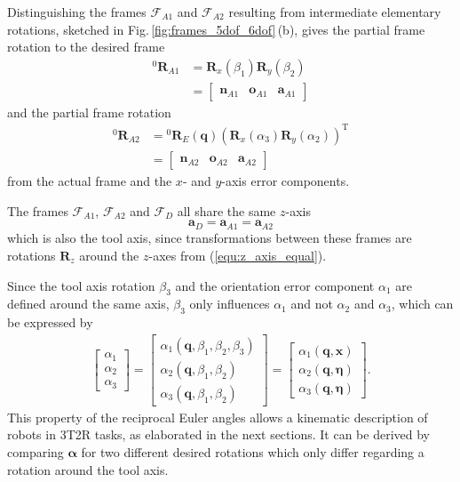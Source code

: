\documentclass{svproc}
\newcommand{\bm}[1]{\boldsymbol{#1}}
\newcommand{\vek}[3]{\boldsymbol{#1}^{#2}_{#3}}
\newcommand{\rotmat}[2]{{{ }^{#1}\boldsymbol{R}}_{#2}}
\newcommand{\transp}[0]{{\mathrm{T}}}
\newcommand{\ks}[1]{{\mathcal{F}}_{#1}}
\begin{document}
Distinguishing the frames $\ks{A1}$ and $\ks{A2}$ resulting from intermediate elementary rotations, sketched in Fig.\,\ref{fig:frames_5dof_6dof}\,(b), gives the partial frame rotation to the desired frame
%
\begin{align}
\rotmat{0}{A1} 
&= 
\bm{R}_x(\beta_1) \bm{R}_y(\beta_2)\\
&=
\begin{bmatrix}
\vek{n}{}{A1} & \vek{o}{}{A1} & \vek{a}{}{A1}
\end{bmatrix} \nonumber
\end{align}
%
and the partial frame rotation
%
\begin{align}
\rotmat{0}{A2} 
&= 
\rotmat{0}{E}(\bm{q})
\left(\bm{R}_x(\alpha_3) \bm{R}_y(\alpha_2)\right)^\transp \\ 
&=
\begin{bmatrix}
\vek{n}{}{A2} & \vek{o}{}{A2} & \vek{a}{}{A2}
\end{bmatrix}\nonumber
\end{align}
%
from the actual frame and the $x$- and $y$-axis error components.

The frames $\ks{A1}$, $\ks{A2}$ and $\ks{D}$ all share the same $z$-axis
%
\begin{equation}
\vek{a}{}{D}
=
\vek{a}{}{A1}
=
\vek{a}{}{A2}
\label{equ:z_axis_equal}
\end{equation}
%
which is also the tool axis, since transformations between these frames are rotations $\bm{R}_z$ around the $z$-axes from (\ref{equ:z_axis_equal}).

Since the tool axis rotation $\beta_3$ and the orientation error component $\alpha_1$ are defined around the same axis, $\beta_3$ only influences $\alpha_1$ and not $\alpha_2$ and $\alpha_3$, which can be expressed by
%
\begin{align}
\begin{bmatrix}
\alpha_1 \\
\alpha_2 \\
\alpha_3
\end{bmatrix}
=
\begin{bmatrix}
\alpha_1(\bm{q},\beta_1,\beta_2,\beta_3) \\
\alpha_2(\bm{q},\beta_1,\beta_2) \\
\alpha_3(\bm{q},\beta_1,\beta_2)
\end{bmatrix}
=
\begin{bmatrix}
\alpha_1(\bm{q},\bm{x}) \\
\alpha_2(\bm{q},\bm{\eta}) \\
\alpha_3(\bm{q},\bm{\eta}) 
\end{bmatrix}
\label{equ:alpha_dep_beta}.
\end{align}
%
This property of the reciprocal Euler angles allows a kinematic description of robots in 3T2R tasks, as elaborated in the next sections.
It can be derived by comparing $\bm{\alpha}$ for two different desired rotations which only differ regarding a rotation around the tool axis.
\end{document}
